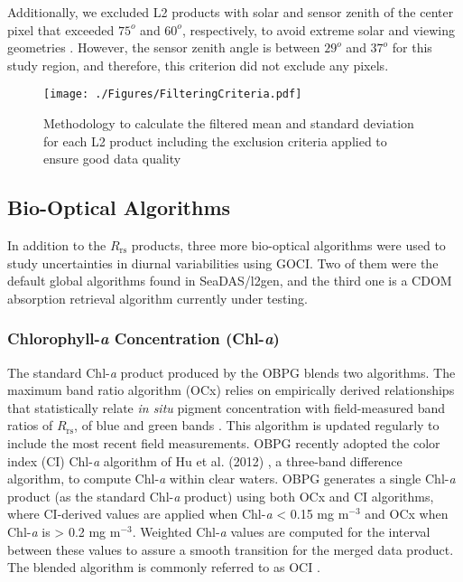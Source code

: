 \documentclass[remotesensing,article,submit,moreauthors,pdftex,10pt,a4paper]{Definitions/mdpi}
\begin{document}
Additionally, we excluded L2 products with solar and sensor zenith of the center pixel that exceeded $75^o$ and $60^o$, respectively, to avoid extreme solar and viewing geometries \cite{Bailey2006}. However, the sensor zenith angle is between $29^o$ and $37^o$ for this study region, and therefore, this criterion did not exclude any pixels. 

\begin{figure}[ht]
  \centering
    \texttt{[image: ./Figures/FilteringCriteria.pdf]}
  \caption{Methodology to calculate the filtered mean and standard deviation for each L2 product including the exclusion criteria applied to ensure good data quality}\label{fig:FilteringCriteria}
\end{figure}

\subsection{Bio-Optical Algorithms} \label{subsec:bioopalg}
In addition to the $R_\text{rs}$ products, three more bio-optical algorithms were used to study uncertainties in diurnal variabilities using GOCI. Two of them were the default global algorithms found in SeaDAS/l2gen, and the third one is a CDOM absorption retrieval algorithm currently under testing. 
\subsubsection{Chlorophyll-{\it a} Concentration (Chl-{\it a})}
The standard Chl-{\it a} product produced by the OBPG blends two algorithms. The maximum band ratio algorithm (OCx) relies on empirically derived relationships that statistically relate {\it in situ} pigment concentration with field-measured band ratios of $R_\text{rs}$, of blue and green bands \cite{OReilly1998_Chl}. This algorithm is updated regularly to include the most recent field measurements. OBPG recently adopted the color index (CI) Chl-{\it a} algorithm of Hu et al. (2012) \cite{Hu2012}, a three-band difference algorithm, to compute Chl-{\it a} within clear waters. OBPG generates a single Chl-{\it a} product (as the standard Chl-{\it a} product) using both OCx and CI algorithms, where CI-derived values are applied when Chl-{\it a} < 0.15 mg m$^{-3}$ and OCx when Chl-{\it a} is > 0.2 mg m$^{-3}$. Weighted Chl-{\it a} values are computed for the interval between these values to assure a smooth transition for the merged data product. The blended algorithm is commonly referred to as OCI \cite{Hu2012}. 
\end{document}
